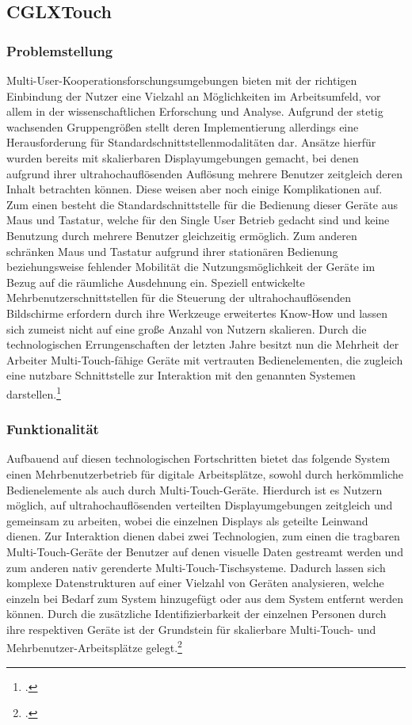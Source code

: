 \subsection{CGLXTouch}
\subsubsection{Problemstellung}
Multi-User-Kooperationsforschungsumgebungen bieten mit der richtigen Einbindung der Nutzer eine Vielzahl an Möglichkeiten im Arbeitsumfeld, vor allem in der wissenschaftlichen Erforschung und Analyse. Aufgrund der stetig wachsenden Gruppengrößen stellt deren Implementierung allerdings eine Herausforderung für Standardschnittstellenmodalitäten dar. Ansätze hierfür wurden bereits mit skalierbaren Displayumgebungen gemacht, bei denen aufgrund ihrer ultrahochauflösenden Auflösung mehrere Benutzer zeitgleich deren Inhalt betrachten können. Diese weisen aber noch einige Komplikationen auf. Zum einen besteht die Standardschnittstelle für die Bedienung dieser Geräte aus Maus und Tastatur, welche für den Single User Betrieb gedacht sind und keine Benutzung durch mehrere Benutzer gleichzeitig ermöglich. Zum anderen schränken Maus und Tastatur aufgrund ihrer stationären Bedienung beziehungsweise fehlender Mobilität die Nutzungsmöglichkeit der Geräte im Bezug auf die räumliche Ausdehnung ein. Speziell entwickelte Mehrbenutzerschnittstellen für die Steuerung der ultrahochauflösenden Bildschirme erfordern durch ihre Werkzeuge erweitertes Know-How und lassen sich zumeist nicht auf eine große Anzahl von Nutzern skalieren. Durch die technologischen Errungenschaften der letzten Jahre besitzt nun die Mehrheit der Arbeiter Multi-Touch-fähige Geräte mit vertrauten Bedienelementen, die zugleich eine nutzbare Schnittstelle zur Interaktion mit den genannten Systemen darstellen.\footcite[Vgl.][Seite 649]{Table}

\subsubsection{Funktionalität}
Aufbauend auf diesen technologischen Fortschritten bietet das folgende System einen Mehrbenutzerbetrieb für digitale Arbeitsplätze, sowohl durch herkömmliche Bedienelemente als auch durch Multi-Touch-Geräte. Hierdurch ist es Nutzern möglich, auf ultrahochauflösenden verteilten Displayumgebungen zeitgleich und gemeinsam zu arbeiten, wobei die einzelnen Displays als geteilte Leinwand dienen. Zur Interaktion dienen dabei zwei Technologien, zum einen die tragbaren Multi-Touch-Geräte der Benutzer auf denen visuelle Daten gestreamt werden und zum anderen nativ gerenderte Multi-Touch-Tischsysteme. Dadurch lassen sich komplexe Datenstrukturen auf einer Vielzahl von Geräten analysieren, welche einzeln bei Bedarf zum System hinzugefügt oder aus dem System entfernt werden können. Durch die zusätzliche Identifizierbarkeit der einzelnen Personen durch ihre respektiven Geräte ist der Grundstein für skalierbare Multi-Touch- und Mehrbenutzer-Arbeitsplätze gelegt.\footcite[Vgl.][Seite 649]{Table}

